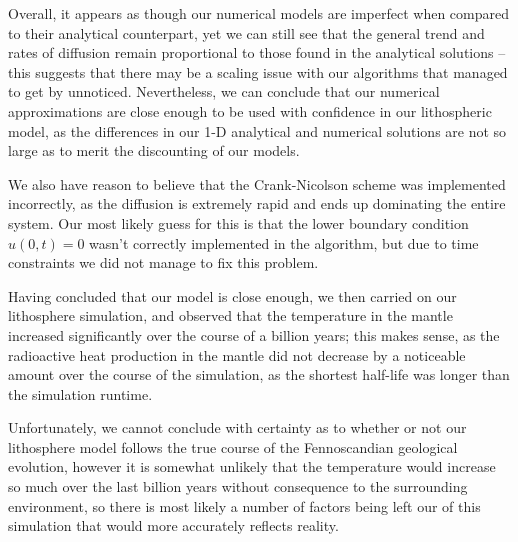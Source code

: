 \documentclass[a4paper,10pt,english]{article}
\begin{document}
Overall, it appears as though our numerical models are imperfect when compared to their analytical counterpart, yet we can still see that the general trend and rates of diffusion remain proportional to those found in the analytical solutions – this suggests that there may be a scaling issue with our algorithms that managed to get by unnoticed.  Nevertheless, we can conclude that our numerical approximations are close enough to be used with confidence in our lithospheric model, as the differences in our 1-D analytical and numerical solutions are not so large as to merit the discounting of our models.


We also have reason to believe that the Crank-Nicolson scheme was implemented incorrectly, as the diffusion is extremely rapid and ends up dominating the entire system. Our most likely guess for this is that the lower boundary condition $u(0,t)=0$ wasn't correctly implemented in the algorithm, but due to time constraints we did not manage to fix this problem. 


Having concluded that our model is close enough, we then carried on our lithosphere simulation, and observed that the temperature in the mantle increased significantly over the course of a billion years; this makes sense, as the radioactive heat production in the mantle did not decrease by a noticeable amount over the course of the simulation, as the shortest half-life was longer than the simulation runtime.

Unfortunately, we cannot conclude with certainty as to whether or not our lithosphere model follows the true course of the Fennoscandian geological evolution, however it is somewhat unlikely that the temperature would increase so much over the last billion years without consequence to the surrounding environment, so there is most likely a number of factors being left our of this simulation that would more accurately reflects reality.

{}

\end{document}
